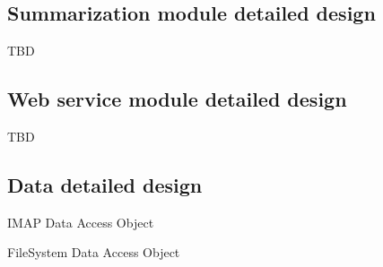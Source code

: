 \documentclass[12pt]{article}
\newenvironment{my_itemize}
{\begin{itemize}
  \setlength{\itemsep}{0cm}
  \setlength{\parskip}{0cm}}
{\end{itemize}}
\begin{document}
\subsection{Summarization module detailed design}
TBD

\subsection{Web service module detailed design}
TBD

\subsection{Data detailed design}

\begin{my_itemize}
  \item IMAP Data Access Object
  \item FileSystem Data Access Object
\end{my_itemize}
\end{document}
